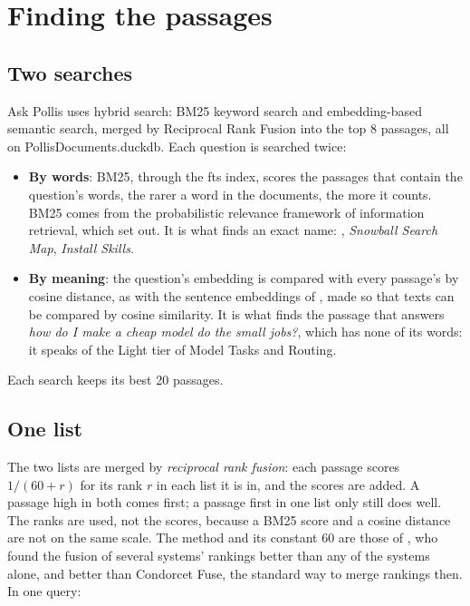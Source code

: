 \section{Finding the passages}\label{sec:finding}

\subsection{Two searches}
Ask Pollis uses hybrid search: BM25 keyword search and embedding-based semantic search, merged by Reciprocal
Rank Fusion into the top 8 passages, all on PollisDocuments.duckdb. Each question is searched twice:
\begin{itemize}
  \item \textbf{By words}: BM25, through the fts index, scores the passages that contain the question's words, the
    rarer a word in the documents, the more it counts. BM25 comes from the probabilistic relevance framework of
    information retrieval, which  set out. It is what finds an exact name:
    , \emph{Snowball Search Map}, \emph{Install Skills}.
  \item \textbf{By meaning}: the question's embedding is compared with every passage's by cosine distance, as
    with the sentence embeddings of , made so that texts can be
    compared by cosine similarity. It is what
    finds the passage that answers \emph{how do I make a cheap model do the small jobs?}, which has none of its words:
    it speaks of the Light tier of Model Tasks and Routing.
\end{itemize}
Each search keeps its best 20 passages.

\subsection{One list}
The two lists are merged by \emph{reciprocal rank fusion}: each passage scores $1/(60 + r)$ for its rank $r$ in each
list it is in, and the scores are added. A passage high in both comes first; a passage first in one list only still
does well. The ranks are used, not the scores, because a BM25 score and a cosine distance are not on the same scale. The
method and its constant 60 are those of , who found the
fusion of several systems' rankings better than any of the systems alone, and better than Condorcet Fuse, the
standard way to merge rankings then. In
one query:

